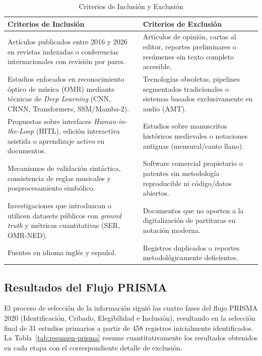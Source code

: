 \begin{table}[htbp]
\caption{Criterios de Inclusi\'on y Exclusi\'on}
\label{tab:criterios-prisma}
\centering
\footnotesize
\begin{tabular}{|p{3.8cm}|p{3.8cm}|}
\hline
\textbf{Criterios de Inclusi\'on} & \textbf{Criterios de Exclusi\'on} \\
\hline
Art\'iculos publicados entre 2016 y 2026 en revistas indexadas o conferencias internacionales con revisi\'on por pares. & Art\'iculos de opini\'on, cartas al editor, reportes preliminares o res\'umenes sin texto completo accesible. \\
\hline
Estudios enfocados en reconocimiento \'optico de m\'usica (OMR) mediante t\'ecnicas de \emph{Deep Learning} (CNN, CRNN, Transformers, SSM/Mamba-2). & Tecnolog\'ias obsoletas, pipelines segmentados tradicionales o sistemas basados exclusivamente en audio (AMT). \\
\hline
Propuestas sobre interfaces \emph{Human-in-the-Loop} (HITL), edici\'on interactiva asistida o aprendizaje activo en documentos. & Estudios sobre manuscritos hist\'oricos medievales o notaciones antiguas (mensural/canto llano). \\
\hline
Mecanismos de validaci\'on sint\'actica, consistencia de reglas musicales y posprocesamiento simb\'olico. & Software comercial propietario o patentes sin metodolog\'ia reproducible ni c\'odigo/datos abiertos. \\
\hline
Investigaciones que introduzcan o utilicen datasets p\'ublicos con \emph{ground truth} y m\'etricas cuantitativas (SER, OMR-NED). & Documentos que no aporten a la digitalizaci\'on de partituras en notaci\'on moderna. \\
\hline
Fuentes en idioma ingl\'es y espa\~nol. & Registros duplicados o reportes metodol\'ogicamente deficientes. \\
\hline
\end{tabular}
\end{table}

\subsection{Resultados del Flujo PRISMA}
\label{sec:resultados-prisma}

El proceso de selecci\'on de la informaci\'on sigui\'o las cuatro fases del flujo PRISMA 2020 (Identificaci\'on, Cribado, Elegibilidad e Inclusi\'on), resultando en la selecci\'on final de 31 estudios primarios a partir de 458 registros inicialmente identificados. La Tabla~\ref{tab:resumen-prisma} resume cuantitativamente los resultados obtenidos en cada etapa con el correspondiente detalle de exclusi\'on.

